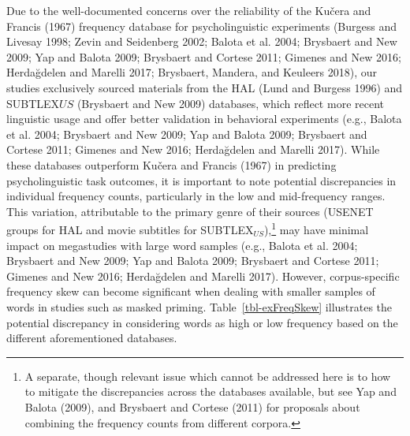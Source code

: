\documentclass[
]{interact}
\begin{document}
Due to the well-documented concerns over the reliability of the Kučera
and Francis (1967) frequency database for psycholinguistic experiments
(Burgess and Livesay 1998; Zevin and Seidenberg 2002; Balota et al.
2004; Brysbaert and New 2009; Yap and Balota 2009; Brysbaert and Cortese
2011; Gimenes and New 2016; Herdağdelen and Marelli 2017; Brysbaert,
Mandera, and Keuleers 2018), our studies exclusively sourced materials
from the HAL (Lund and Burgess 1996) and SUBTLEX\({US}\) (Brysbaert and
New 2009) databases, which reflect more recent linguistic usage and
offer better validation in behavioral experiments (e.g., Balota et al.
2004; Brysbaert and New 2009; Yap and Balota 2009; Brysbaert and Cortese
2011; Gimenes and New 2016; Herdağdelen and Marelli 2017). While these
databases outperform Kučera and Francis (1967) in predicting
psycholinguistic task outcomes, it is important to note potential
discrepancies in individual frequency counts, particularly in the low
and mid-frequency ranges. This variation, attributable to the primary
genre of their sources (USENET groups for HAL and movie subtitles for
SUBTLEX\(_{US}\)),\footnote{A separate, though relevant issue which
  cannot be addressed here is to how to mitigate the discrepancies
  across the databases available, but see Yap and Balota (2009), and
  Brysbaert and Cortese (2011) for proposals about combining the
  frequency counts from different corpora.\label{fn-databases}} may have
minimal impact on megastudies with large word samples (e.g., Balota et
al. 2004; Brysbaert and New 2009; Yap and Balota 2009; Brysbaert and
Cortese 2011; Gimenes and New 2016; Herdağdelen and Marelli 2017).
However, corpus-specific frequency skew can become significant when
dealing with smaller samples of words in studies such as masked priming.
Table~\ref{tbl-exFreqSkew} illustrates the potential discrepancy in
considering words as high or low frequency based on the different
aforementioned databases.
\end{document}
